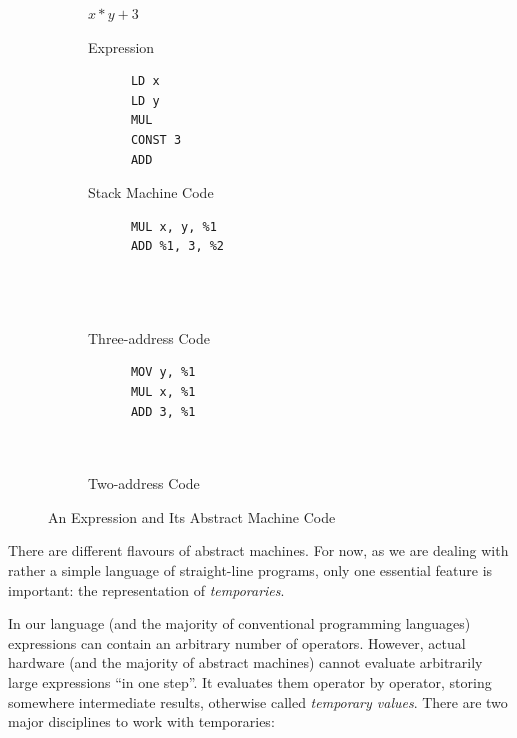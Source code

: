 \begin{figure}[t]
  \centering

  \begin{subfigure}[t]{\textwidth}
   \centering
    $x*y+3$
    \caption{Expression}
    \label{expr}
  \end{subfigure}
  \vskip5mm
  \begin{subfigure}[t]{0.3\textwidth}
  \begin{verbatim}
      LD x
      LD y
      MUL
      CONST 3
      ADD
  \end{verbatim}  
  \caption{Stack Machine Code}
  \label{expr-stack}
  \end{subfigure}
  \begin{subfigure}[t]{0.3\textwidth}
  \begin{verbatim}
      MUL x, y, %1
      ADD %1, 3, %2


      
  \end{verbatim}  
  \caption{Three-address Code}
  \label{expr-3addr}
  \end{subfigure}
  \begin{subfigure}[t]{0.3\textwidth}
  \begin{verbatim}
      MOV y, %1
      MUL x, %1
      ADD 3, %1

      
  \end{verbatim}  
  \caption{Two-address Code}
  \label{expr-2addr}
  \end{subfigure}
  \caption{An Expression and Its Abstract Machine Code}
\end{figure}

There are different flavours of abstract machines. For now, as we are dealing with rather a simple language of
straight-line programs, only one essential feature is important: the representation of \emph{temporaries}.

In our language (and the majority of conventional programming languages) expressions can contain an arbitrary
number of operators. However, actual hardware (and the majority of abstract machines) cannot evaluate arbitrarily
large expressions ``in one step''. It evaluates them operator by operator, storing somewhere intermediate results, otherwise
called \emph{temporary values}. There are two major disciplines to work with temporaries:


